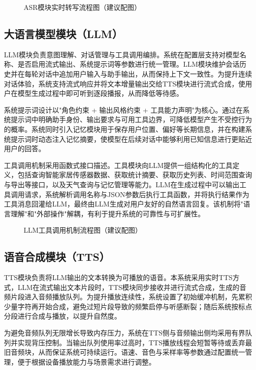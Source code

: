 \begin{figure}[H]
\centering
{}
\caption{ASR模块实时转写流程图（建议配图）}
\label{fig:asr_flow}
\end{figure}

\subsection{大语言模型模块（LLM）}
\par LLM模块负责意图理解、对话管理与工具调用编排。系统在配置层支持对模型名称、是否启用流式输出、系统提示词等参数进行统一管理。LLM模块维护会话历史并在每轮对话中追加用户输入与助手输出，从而保持上下文一致性。为提升连续对话体验，系统支持流式响应并将文本增量输出交给TTS模块进行流式合成，使用户在模型生成过程中即可听到逐段播报，从而降低等待感。
\par 系统提示词设计以"角色约束 + 输出风格约束 + 工具能力声明"为核心。通过在系统提示词中明确助手身份、输出要求与可用工具边界，可降低模型产生不受控行为的概率。系统同时引入记忆模块用于保存用户位置、偏好等长期信息，并在构建系统提示词时动态注入记忆摘要，使模型在后续对话中能够利用已知信息进行更贴近用户的回答。
\par 工具调用机制采用函数式接口描述。工具模块向LLM提供一组结构化的工具定义，包括查询智能家居传感器数据、获取统计摘要、获取历史列表、时间范围查询与导出等接口，以及天气查询与记忆管理等能力。LLM在生成过程中可以输出工具调用请求，系统解析调用名称与JSON参数后执行工具函数，并将执行结果作为工具消息回灌给LLM，最终由LLM生成对用户友好的自然语言回复。该机制将"语言理解"和"外部操作"解耦，有利于提升系统的可靠性与可扩展性。

\begin{figure}[H]
\centering
{}
\caption{LLM工具调用机制流程图（建议配图）}
\label{fig:llm_tool_calling}
\end{figure}

\subsection{语音合成模块（TTS）}
\par TTS模块负责将LLM输出的文本转换为可播放的语音。本系统采用实时TTS方式，LLM在流式输出文本片段时，TTS模块同步接收并进行流式合成，生成的音频片段进入音频播放队列。为提升播放连续性，系统设置了初始缓冲机制，先累积少量字符再开始合成，避免过短片段导致的频繁启停与听感断裂；随后系统按标点分段进行合成与播放，以提升自然度。
\par 为避免音频队列无限增长导致内存压力，系统在TTS侧与音频输出侧均采用有界队列并实现背压控制。当输出队列使用率过高时，TTS播放线程会短暂等待或丢弃最旧音频块，从而保证系统可持续运行。语速、音色与采样率等参数通过配置统一管理，便于根据设备播放能力与场景需求进行调整。

